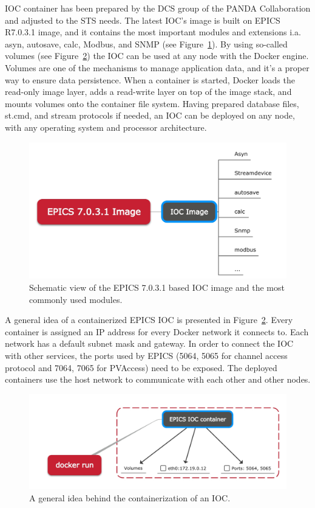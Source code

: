 IOC container has been prepared by the \gls{DCS} group of the \gls{PANDA} Collaboration and adjusted to the \gls{STS} needs. The latest \gls{IOC}'s image is built on EPICS R7.0.3.1 image, and it contains the most important modules and extensions i.a. asyn, autosave, calc, Modbus, and SNMP (see Figure~\ref{fig_ioc1}). By using so-called volumes (see Figure~\ref{fig_doc}) the \gls{IOC} can be used at any node with the Docker engine. Volumes are one of the mechanisms to manage application data, and it's a proper way to ensure data persistence. When a container is started, Docker loads the read-only image layer, adds a read-write layer on top of the image stack, and mounts volumes onto the container file system. Having prepared database files, st.cmd, and stream protocols if needed, an \gls{IOC} can be deployed on any node, with any operating system and processor architecture.
\begin{figure}[!h]
\centering
\includegraphics[width=0.7\columnwidth]{Chapter4/images/epics_ioc.jpg}
\caption{Schematic view of the EPICS 7.0.3.1 based \gls{IOC} image and the most commonly used modules.}
\label{fig_ioc1}
\end{figure}
\newpage
A general idea of a containerized \gls{EPICS} \gls{IOC} is presented in Figure~\ref{fig_doc}. Every container is assigned an IP address for every Docker network it connects to. Each network has a default subnet mask and gateway. In order to connect the \gls{IOC} with other services, the ports used by \gls{EPICS} (5064, 5065 for channel access protocol and 7064, 7065 for PVAccess) need to be exposed.  The deployed containers use the host network to communicate with each other and other nodes.
\begin{figure}[!h]
\centering
\includegraphics[width=0.75\columnwidth]{Chapter4/images/docker_run.jpg}
\caption{A general idea behind the containerization of an \gls{IOC}.}
\label{fig_doc}
\end{figure}
